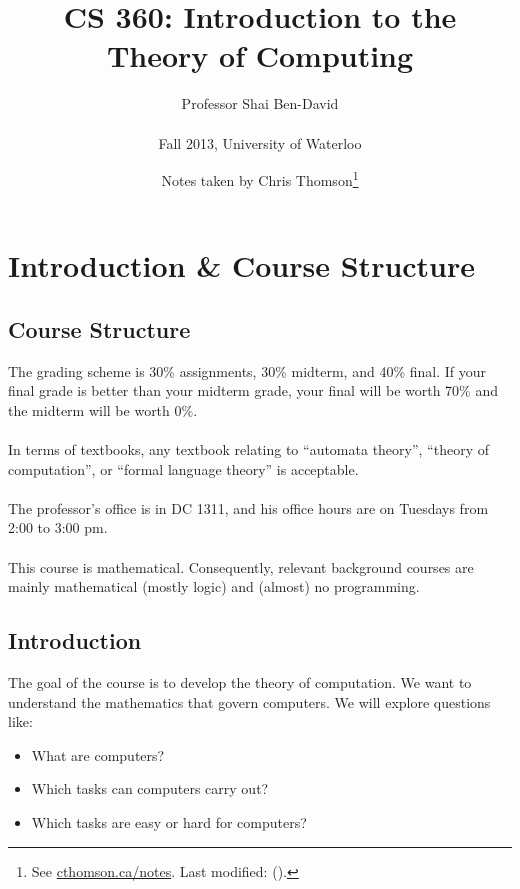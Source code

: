 \documentclass[]{article}
\theoremstyle{definition}
\newcommand{\lecture}[1]{\marginpar{{\footnotesize $\leftarrow$ \underline{#1}}}}
\begin{document}
	\let\ref\Cref

	\title{\bf{CS 360: Introduction to the Theory of Computing}}
	\author{Professor Shai Ben-David \\ \\ Fall 2013, University of Waterloo}
  \date{Notes taken by Chris Thomson\thanks{See \href{http://cthomson.ca/notes}{cthomson.ca/notes}.
	\ifdefined\sha %
		Last modified: \commitDateTime{} ({\href{https://github.com/christhomson/lecture-notes/commit/\sha}{\sha}}).
	\fi}}

	\maketitle

	\section{Introduction \& Course Structure} \lecture{September 10, 2013}
    \subsection{Course Structure}
      The grading scheme is 30\% assignments, 30\% midterm, and 40\% final. If your final grade is better than your midterm grade, your final will be worth 70\% and the midterm will be worth 0\%.
      \\ \\
      In terms of textbooks, any textbook relating to ``automata theory'', ``theory of computation'', or ``formal language theory'' is acceptable.
      \\ \\
      The professor's office is in DC 1311, and his office hours are on Tuesdays from 2:00 to 3:00 pm.
      \\ \\
      This course is mathematical. Consequently, relevant background courses are mainly mathematical (mostly logic) and  (almost) no programming.

    \subsection{Introduction}
      The goal of the course is to develop the theory of computation. We want to understand the mathematics that govern computers. We will explore questions like:
      \begin{itemize}
        \item What are computers?
        \item Which tasks can computers carry out?
        \item Which tasks are easy or hard for computers?
      \end{itemize}
\end{document}

